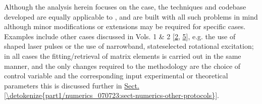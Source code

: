 \documentclass[letterpaper,table,10pt,english]{jupyterBook}
\begin{document}
\sphinxAtStartPar
Although the analysis herein focuses on the {\hyperref[\detokenize{backmatter/glossary:term-RWP}]{}} case, the techniques and codebase developed are equally applicable to , and are built with all such problems in mind \sphinxhyphen{} although minor modifications or extensions may be required for specific cases. Examples include other cases discussed in  Vols. 1 \& 2 {[}\hyperlink{cite.backmatter/bibliography:id663}{2}, \hyperlink{cite.backmatter/bibliography:id664}{5}{]}, e.g. the use of shaped laser pulses or the use of narrow\sphinxhyphen{}band, state\sphinxhyphen{}selected rotational excitation; in all cases the fitting/retrieval of matrix elements is carried out in the same manner, and the only changes required to the methodology are the choice of control variable and the corresponding input experimental or theoretical parameters \sphinxhyphen{} this is discussed further in \hyperref[\detokenize{part1/numerics_070723:sect-numerics-other-protocols}]{Sect.\@ \ref{\detokenize{part1/numerics_070723:sect-numerics-other-protocols}}}.
\end{document}
